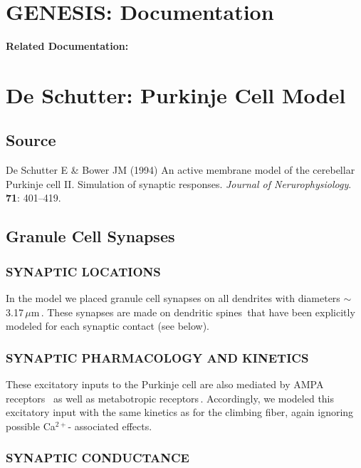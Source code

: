 \documentclass[12pt]{article}
\begin{document}
\section*{GENESIS: Documentation}

{\bf Related Documentation:}

\section*{De Schutter: Purkinje Cell Model}

\subsection*{Source}

De Schutter E \& Bower JM (1994) An active membrane model of the cerebellar Purkinje cell II. Simulation of synaptic responses. {\it Journal of Nerurophysiology}. {\bf 71}: 401--419.

\subsection*{Granule Cell Synapses}

\subsubsection*{SYNAPTIC LOCATIONS}

In the model we placed granule cell synapses
on all dendrites with diameters $\sim$3.17\,$\mu$m\,\cite{Palay:1974fk}.
These synapses are made on dendritic spines\,\cite{M:1988bh} 
that have been explicitly modeled for each
synaptic contact (see below).

\subsubsection*{SYNAPTIC PHARMACOLOGY AND KINETICS}

These excitatory inputs to the Purkinje cell are also mediated by AMPA receptors
\,\cite{Farrant:1991hc, Garthwaite:1989ij, Lambolez:1992bs}
as well as metabotropic receptors\,\cite{Blackstone:1989fu, Glaum:1992kl, Vranesic:2qa}. Accordingly,
we modeled this excitatory input with the same kinetics as
for the climbing fiber, again ignoring possible Ca$^{2+}$- associated effects.

\subsubsection*{SYNAPTIC CONDUCTANCE}
\end{document}
